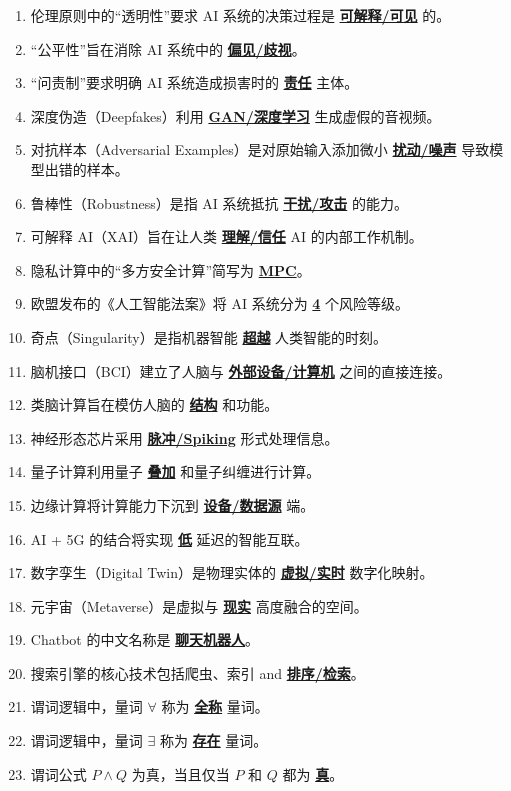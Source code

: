 \documentclass[12pt,a4paper,openany]{ctexbook}
\begin{document}
\begin{enumerate}[resume,leftmargin=2em,itemsep=1pt]
\item 伦理原则中的“透明性”要求 AI 系统的决策过程是 \underline{\textbf{可解释/可见}} 的。
\item “公平性”旨在消除 AI 系统中的 \underline{\textbf{偏见/歧视}}。
\item “问责制”要求明确 AI 系统造成损害时的 \underline{\textbf{责任}} 主体。
\item 深度伪造（Deepfakes）利用 \underline{\textbf{GAN/深度学习}} 生成虚假的音视频。
\item 对抗样本（Adversarial Examples）是对原始输入添加微小 \underline{\textbf{扰动/噪声}} 导致模型出错的样本。
\item 鲁棒性（Robustness）是指 AI 系统抵抗 \underline{\textbf{干扰/攻击}} 的能力。
\item 可解释 AI（XAI）旨在让人类 \underline{\textbf{理解/信任}} AI 的内部工作机制。
\item 隐私计算中的“多方安全计算”简写为 \underline{\textbf{MPC}}。
\item 欧盟发布的《人工智能法案》将 AI 系统分为 \underline{\textbf{4}} 个风险等级。
\item 奇点（Singularity）是指机器智能 \underline{\textbf{超越}} 人类智能的时刻。
\item 脑机接口（BCI）建立了人脑与 \underline{\textbf{外部设备/计算机}} 之间的直接连接。
\item 类脑计算旨在模仿人脑的 \underline{\textbf{结构}} 和功能。
\item 神经形态芯片采用 \underline{\textbf{脉冲/Spiking}} 形式处理信息。
\item 量子计算利用量子 \underline{\textbf{叠加}} 和量子纠缠进行计算。
\item 边缘计算将计算能力下沉到 \underline{\textbf{设备/数据源}} 端。
\item AI + 5G 的结合将实现 \underline{\textbf{低}} 延迟的智能互联。
\item 数字孪生（Digital Twin）是物理实体的 \underline{\textbf{虚拟/实时}} 数字化映射。
\item 元宇宙（Metaverse）是虚拟与 \underline{\textbf{现实}} 高度融合的空间。
\item Chatbot 的中文名称是 \underline{\textbf{聊天机器人}}。
\item 搜索引擎的核心技术包括爬虫、索引 and \underline{\textbf{排序/检索}}。
\item 谓词逻辑中，量词 $\forall$ 称为 \underline{\textbf{全称}} 量词。
\item 谓词逻辑中，量词 $\exists$ 称为 \underline{\textbf{存在}} 量词。
\item 谓词公式 $P \land Q$ 为真，当且仅当 $P$ 和 $Q$ 都为 \underline{\textbf{真}}。

\end{enumerate}
\end{document}
